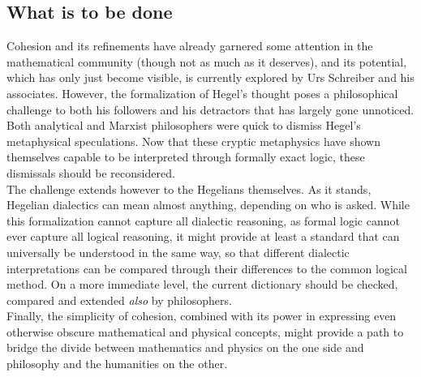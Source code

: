 \documentclass{article}
\begin{document}
\subsection{What is to be done}
Cohesion and its refinements have already garnered some attention in the mathematical community (though not as much as it deserves), and its potential, which has only just become visible, is currently explored by Urs Schreiber and his associates. However, the formalization of Hegel's thought poses a philosophical challenge to both his followers and his detractors that has largely gone unnoticed. Both analytical and Marxist philosophers were quick to dismiss Hegel's metaphysical speculations. Now that these cryptic metaphysics have shown themselves capable to be interpreted through formally exact logic, these dismissals should be reconsidered. \\

The challenge extends however to the Hegelians themselves. As it stands, Hegelian dialectics can mean almost anything, depending on who is asked. While this formalization cannot capture all dialectic reasoning, as formal logic cannot ever capture all logical reasoning, it might provide at least a standard that can universally be understood in the same way, so that different dialectic interpretations can be compared through their differences to the common logical method. On a more immediate level, the current dictionary should be checked, compared and extended \emph{also} by philosophers. \\

Finally, the simplicity of cohesion, combined with its power in expressing even otherwise obscure mathematical and physical concepts, might provide a path to bridge the divide between mathematics and physics on the one side and philosophy and the humanities on the other.















\printbibliography[
heading=bibintoc,
title={References}
]
\end{document}
